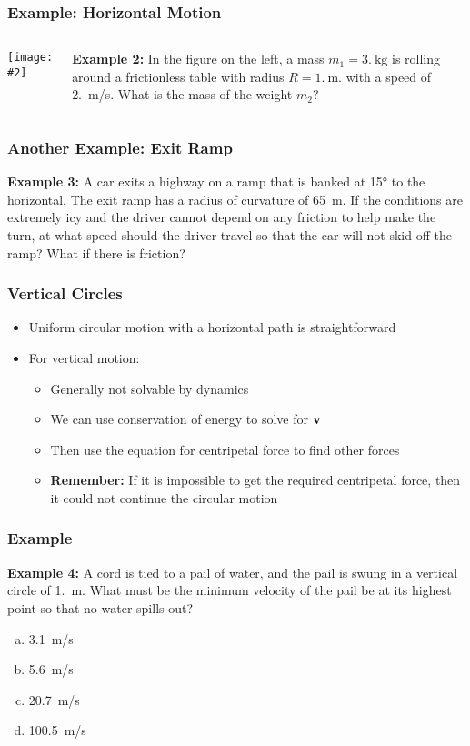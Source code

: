 \documentclass[12pt,compress,aspectratio=169]{beamer}
\newcommand{\pic}[2]{\texttt{[image: \#2]}}
\newcommand{\mb}[1]{\ensuremath\mathbf{#1}}
\begin{document}
\begin{frame}
  \frametitle{Example: Horizontal Motion}
  \begin{columns}
    \pic{1}{puck-on-table.jpg}
    
    \textbf{Example 2:} In the figure on the left, a mass $m_1=\SI{3.}{\kg}$ is
    rolling around a frictionless table with radius $R=\SI{1.}{\metre}$. with a
    speed of \SI{2.}{\metre/s}. What is the mass of the weight $m_2$?
  \end{columns}
\end{frame}


\begin{frame}
  \frametitle{Another Example: Exit Ramp}
  \textbf{Example 3:} A car exits a highway on a ramp that is banked at
  \ang{15} to the horizontal. The exit ramp has a radius of curvature of
  \SI{65}{\metre}. If the conditions are extremely icy and the driver cannot
  depend on any friction to help make the turn, at what speed should the driver
  travel so that the car will not skid off the ramp? What if there is friction?
\end{frame}


\begin{frame}
  \frametitle{Vertical Circles}
  \begin{itemize}
  \item Uniform circular motion with a horizontal path is straightforward
  \item For vertical motion:
    \begin{itemize}
    \item Generally not solvable by dynamics
    \item We can use conservation of energy to solve for $\mb{v}$
    \item Then use the equation for centripetal force to find other forces
    \item\textbf{Remember: } If it is impossible to get the required
      centripetal force, then it could not continue the circular motion
    \end{itemize}
  \end{itemize}
\end{frame}


\begin{frame}
  \frametitle{Example}
  \textbf{Example 4:} A cord is tied to a pail of water, and the pail is swung
  in a vertical circle of \SI{1.}{\metre}. What must be the minimum velocity of
  the pail be at its highest point so that no water spills out?

  \begin{enumerate}[(a)]
  \item\SI{3.1}{m/\s}
  \item\SI{5.6}{m/\s}
  \item\SI{20.7}{m/\s}
  \item\SI{100.5}{m/\s}
  \end{enumerate}
\end{frame}
\end{document}
